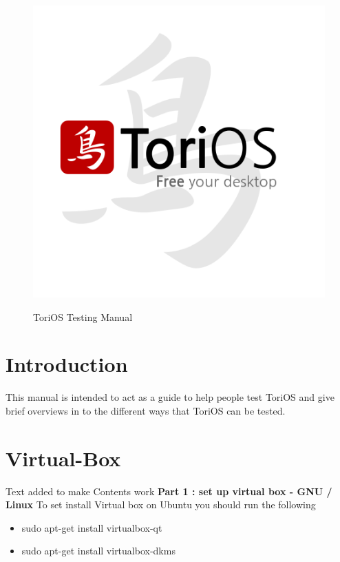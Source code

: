 \documentclass[12pt,a4paper]{book}
\author{Paul Sutton}
\begin{document}
\begin{figure}
\centering
\includegraphics[width=0.7\linewidth]{./FinalLogo}

\begin{center}
{\Huge ToriOS Testing Manual}
\end{center}

\end{figure}

\tableofcontents
{}

\chapter{Introduction}
This manual is intended to act as a guide to help people test ToriOS and give brief overviews in to the different ways that ToriOS can be tested. 

\chapter{Virtual-Box}
Text added to make Contents work
\textbf{Part 1 : set up virtual box - GNU / Linux}
To set install Virtual box on Ubuntu you should run the following \\

\begin{itemize}
\item{sudo apt-get install virtualbox-qt}
\item{sudo apt-get install virtualbox-dkms}
\end{itemize} 
\end{document}
